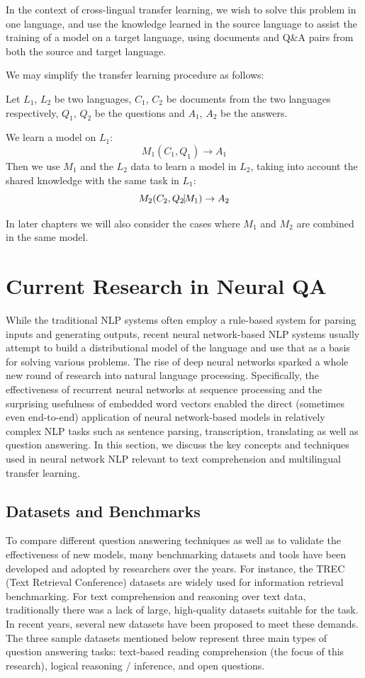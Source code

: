 \documentclass[]{article}
\begin{document}
In the context of cross-lingual transfer learning, we wish to solve this problem in one language, and use the knowledge learned in the source language to assist the training of a model on a target language, using documents and Q\&A pairs from both the source and target language.

We may simplify the transfer learning procedure as follows:

Let $L_1$, $L_2$ be two languages, $C_1$, $C_2$ be documents from the two languages respectively, $Q_1$, $Q_2$ be the questions and $A_1$, $A_2$ be the answers.

We learn a model on $L_1$:
\[  M_1(C_1, Q_1) \to A_1\]
Then we use $M_1$ and the $L_2$ data to learn a model in $L_2$, taking into account the shared knowledge with the same task in $L_1$:
\[  M_2(C_2, Q_2 \vline M_1) \to A_2\]

In later chapters we will also consider the cases where $M_1$ and $M_2$ are combined in the same model.


\section{Current Research in Neural QA}

While the traditional NLP systems often employ a rule-based system for parsing inputs and generating outputs, recent neural network-based NLP systems usually attempt to build a distributional model of the language and use that as a basis for solving various problems. The rise of deep neural networks sparked a whole new round of research into natural language processing. Specifically, the effectiveness of recurrent neural networks at sequence processing and the surprising usefulness of embedded word vectors enabled the direct (sometimes even end-to-end) application of neural network-based models in relatively complex NLP tasks such as sentence parsing, transcription, translating as well as question answering. In this section, we discuss the key concepts and techniques used in neural network NLP relevant to text comprehension and multilingual transfer learning.

\subsection{Datasets and Benchmarks}

To compare different question answering techniques as well as to validate the effectiveness of new models, many benchmarking datasets and tools have been developed and adopted by researchers over the years. For instance, the TREC (Text Retrieval Conference) datasets are widely used for information retrieval benchmarking. For text comprehension and reasoning over text data, traditionally there was a lack of large, high-quality datasets suitable for the task. In recent years, several new datasets have been proposed to meet these demands. The three sample datasets mentioned below represent three main types of question answering tasks: text-based reading comprehension (the focus of this research), logical reasoning / inference, and open questions.
\end{document}
